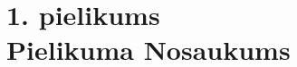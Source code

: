 \chapter[1. pielikums. Pielikuma Nosaukums] {1. pielikums \\  Pielikuma Nosaukums}

    
   
\begin{lstlisting}[language=C++]
\end{lstlisting}


